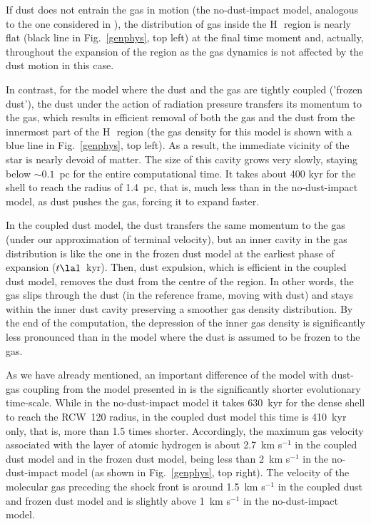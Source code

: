 \documentclass[a4paper,fleqn,usenatbib]{mnras}
\newcommand{\hii}    {H\,{\sc{ii}}~}
\begin{document}
If dust does not entrain the gas in motion (the no-dust-impact model, analogous to the one considered in ), the distribution of gas inside the \hii region is nearly flat (black line in Fig.~\ref{genphys}, top left) at the final time moment and, actually, throughout the expansion of the region as the gas dynamics is not affected by the dust motion in this case.

In contrast, for the model where the dust and the gas are tightly coupled ('frozen dust'), the dust under the action of radiation pressure transfers its momentum to the gas, which results in efficient removal of both the gas and the dust from the innermost part of the \hii region (the gas density for this model is shown with a blue line in Fig.~\ref{genphys}, top left). As a result, the immediate vicinity of the star is nearly devoid of matter. The size of this cavity grows very slowly, staying below $\sim0.1$~pc for the entire computational time. It takes about 400 kyr for the shell to reach the radius of 1.4~pc, that is, much less than in the no-dust-impact model, as dust pushes the gas, forcing it to expand faster.

In the coupled dust model, the dust transfers the same momentum to the gas (under our approximation of terminal velocity), but an inner cavity in the gas distribution is like the one in the frozen dust model at the earliest phase of expansion ($t\la1$~kyr). Then, dust expulsion, which is efficient in the coupled dust model, removes the dust from the centre of the region. In other words, the gas slips through the dust (in the reference frame, moving with dust) and stays within the inner dust cavity preserving a smoother gas density distribution. By the end of the computation, the depression of the inner gas density  is significantly less pronounced than in the model where the dust is assumed to be frozen to the gas.

As we have already mentioned, an important difference of the model with dust-gas coupling from the model presented in  is the significantly shorter evolutionary time-scale. While in the no-dust-impact model it takes 630~kyr for the dense shell to reach the RCW~120 radius, in the coupled dust model this time is 410~kyr only, that is, more than 1.5 times shorter. Accordingly, the maximum gas velocity associated with the layer of atomic hydrogen is about 2.7~km s$^{-1}$ in the coupled dust model and in the frozen dust model, being less than 2~km s$^{-1}$ in the no-dust-impact model (as shown in Fig.~\ref{genphys}, top right). The velocity of the molecular gas preceding the shock front is around 1.5~km s$^{-1}$ in the coupled dust and frozen dust model and is slightly above 1~km s$^{-1}$ in the no-dust-impact model.
\end{document}
